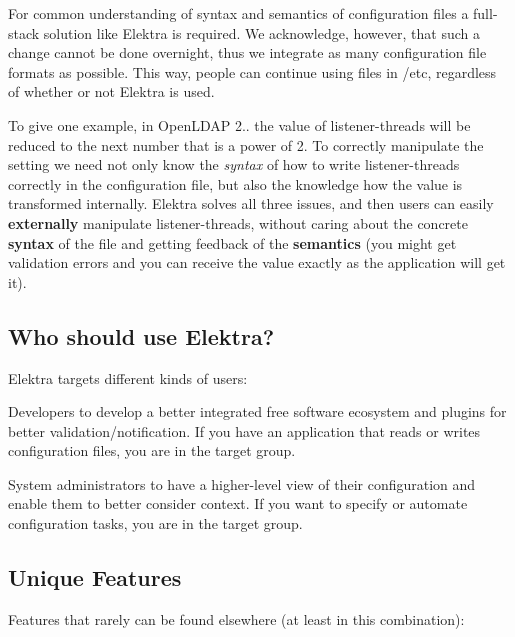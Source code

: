 For common understanding of syntax and semantics of configuration files a full-\/stack solution like Elektra is required. We acknowledge, however, that such a change cannot be done overnight, thus we integrate as many configuration file formats as possible. This way, people can continue using files in {\ttfamily /etc}, regardless of whether or not Elektra is used.

To give one example, in Open\+L\+D\+AP 2.. the value of {\ttfamily listener-\/threads} will be reduced to the next number that is a power of 2. To correctly manipulate the setting we need not only know the {\itshape syntax} of how to write listener-\/threads correctly in the configuration file, but also the knowledge how the value is transformed internally. Elektra solves all three issues, and then users can easily {\bfseries externally} manipulate {\ttfamily listener-\/threads}, without caring about the concrete {\bfseries syntax} of the file and getting feedback of the {\bfseries semantics} (you might get validation errors and you can receive the value exactly as the application will get it).

\subsection*{Who should use Elektra?}

Elektra targets different kinds of users\+:


\begin{DoxyEnumerate}
\item Developers to develop a better integrated free software ecosystem and plugins for better validation/notification. If you have an application that reads or writes configuration files, you are in the target group.
\item System administrators to have a higher-\/level view of their configuration and enable them to better consider context. If you want to specify or automate configuration tasks, you are in the target group.
\end{DoxyEnumerate}

\subsection*{Unique Features}

Features that rarely can be found elsewhere (at least in this combination)\+:


